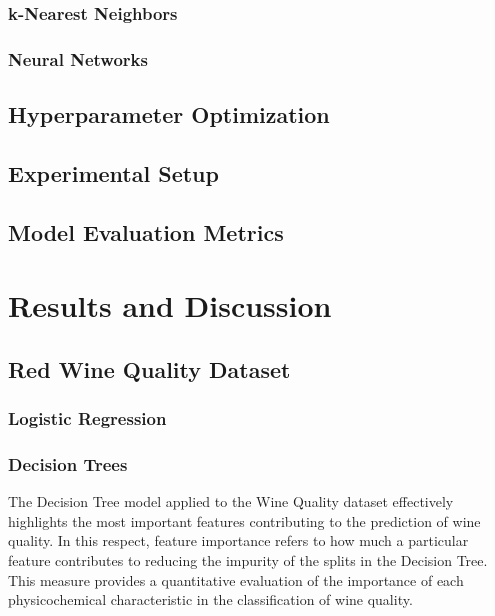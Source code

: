 \documentclass[conference]{IEEEtran}
\begin{document}
\subsubsection{k-Nearest Neighbors}
\subsubsection{Neural Networks}

\subsection{Hyperparameter Optimization}

\subsection{Experimental Setup}
\subsection{Model Evaluation Metrics}


\section{Results and Discussion}
\subsection{Red Wine Quality Dataset}
\subsubsection{Logistic Regression}
\subsubsection{Decision Trees}
The Decision Tree model applied to the Wine Quality dataset effectively highlights the most important features contributing to the prediction of wine quality. In this respect, feature importance refers to how much a particular feature contributes to reducing the impurity of the splits in the Decision Tree. This measure provides a quantitative evaluation of the importance of each physicochemical characteristic in the classification of wine quality.
\end{document}
